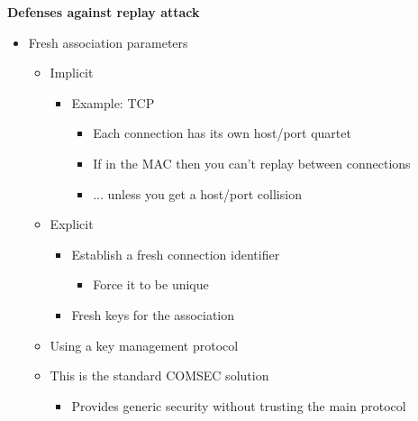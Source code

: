 \documentclass[helvetica]{seminar}
\newcommand{\heading}[1]{%
  \begin{center} 
    \large\bf 
    #1 
  \end{center} 
  \vspace{.4 in}}
\begin{document}
\begin{slide}
\heading{Defenses against replay attack}

\vspace{-.25 in}

\begin{itemize}
\item Fresh association parameters
\begin{itemize}
\item Implicit
\begin{itemize}
\item Example: TCP
\begin{itemize}
\item Each connection has its own host/port quartet
\item If in the MAC then you can't replay between connections
\item ... unless you get a host/port collision
\end{itemize}
\end{itemize}
\item Explicit
\begin{itemize}
\item Establish a fresh connection identifier
\begin{itemize}
\item Force it to be unique
\end{itemize}
\end{itemize}
\begin{itemize}
\item Fresh keys for the association
\end{itemize}
\item Using a key management protocol
\item This is the standard COMSEC solution
\begin{itemize}
\item Provides generic security without trusting the main protocol
\end{itemize}
\end{itemize}
\end{itemize}

\end{slide}
\end{document}
